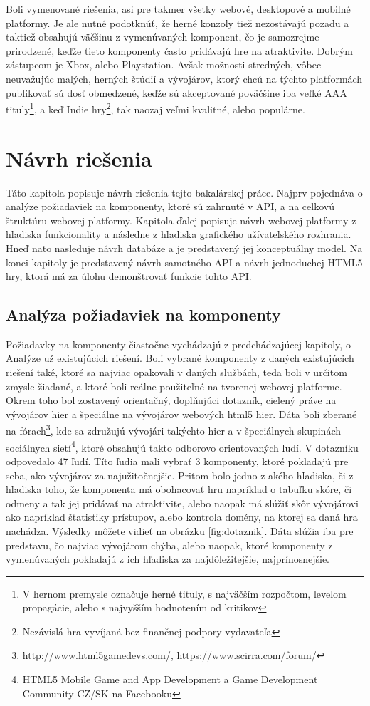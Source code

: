 Boli vymenované riešenia, asi pre takmer všetky webové, desktopové a mobilné platformy. Je ale nutné podotknúť, že herné konzoly tiež nezostávajú pozadu a taktiež obsahujú väčšinu z vymenúvaných komponent, čo je samozrejme prirodzené, keďže tieto komponenty často pridávajú hre na atraktivite. Dobrým zástupcom je Xbox, alebo Playstation. Avšak možnosti stredných, vôbec neuvažujúc malých, herných štúdií a vývojárov, ktorý chcú na týchto platformách publikovať sú dosť obmedzené, keďže sú akceptované poväčšine iba veľké AAA tituly\footnote{V hernom premysle označuje herné tituly, s najväčším rozpočtom, levelom propagácie, alebo s najvyšším hodnotením od kritikov}, a keď Indie hry\footnote{Nezávislá hra vyvíjaná bez finančnej podpory vydavateľa}, tak naozaj veľmi kvalitné, alebo populárne.

\chapter{Návrh riešenia}
\label{chap:navrh}
Táto kapitola popisuje návrh riešenia tejto bakalárskej práce. Najprv pojednáva o analýze požiadaviek na komponenty, ktoré sú zahrnuté v API, a na celkovú štruktúru webovej platformy. Kapitola ďalej popisuje návrh webovej platformy z hľadiska funkcionality a následne z hľadiska grafického užívateľského rozhrania. Hneď nato nasleduje návrh databáze a je predstavený jej konceptuálny model. Na konci kapitoly je predstavený návrh samotného API a návrh jednoduchej HTML5 hry, ktorá má za úlohu demonštrovať funkcie tohto API.  

\section{Analýza požiadaviek na komponenty}
Požiadavky na komponenty čiastočne vychádzajú z predchádzajúcej kapitoly, o Analýze už existujúcich riešení. Boli vybrané komponenty z daných existujúcich riešení také, ktoré sa najviac opakovali v daných službách, teda boli v určitom zmysle žiadané, a ktoré boli reálne použiteľné na tvorenej webovej platforme. Okrem toho bol zostavený orientačný, doplňujúci dotazník, cielený práve na vývojárov hier a špeciálne na vývojárov webových html5 hier. Dáta boli zberané na fórach\footnote{http://www.html5gamedevs.com/, https://www.scirra.com/forum/}, kde sa združujú vývojári takýchto hier a v špeciálnych skupinách sociálnych sietí\footnote{HTML5 Mobile Game and App Development a Game Development Community CZ/SK na Facebooku}, ktoré obsahujú takto odborovo orientovaných ľudí. V dotazníku odpovedalo 47 ľudí. Títo ľudia mali vybrať 3 komponenty, ktoré pokladajú pre seba, ako vývojárov za najužitočnejšie. Pritom bolo jedno z akého hľadiska, či z hľadiska toho, že komponenta má obohacovať hru napríklad o tabuľku skóre, či odmeny a tak jej pridávať na atraktivite, alebo naopak má slúžiť skôr vývojárovi ako napríklad štatistiky prístupov, alebo kontrola domény, na ktorej sa daná hra nachádza. Výsledky môžete vidieť na obrázku \ref{fig:dotaznik}. Dáta slúžia iba pre predstavu, čo najviac vývojárom chýba, alebo naopak, ktoré komponenty z vymenúvaných pokladajú z ich hľadiska za najdôležitejšie, najprínosnejšie.  

